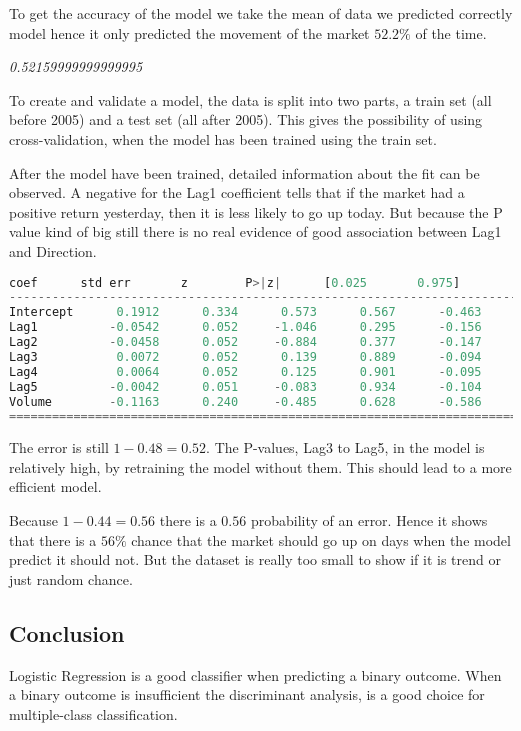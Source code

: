 To get the accuracy of the model we take the mean of data we predicted correctly model hence it only predicted the movement of the market $52.2\%$ of the time.

\noindent\textit{0.52159999999999995}

To create and validate a model, the data is split into two parts, a train set (all before 2005) and a test set (all after 2005). This gives the possibility of using cross-validation, when the model has been trained using the train set.

After the model have been trained, detailed information about the fit can be observed. A negative for the Lag1 coefficient tells that if the market had a positive return yesterday, then it is less likely to go up today. But because the P value kind of big still there is no real evidence of good association between Lag1 and Direction.

\begin{lstlisting}[language=Python]
                coef      std err       z        P>|z|      [0.025       0.975]
------------------------------------------------------------------------------
Intercept      0.1912      0.334      0.573      0.567      -0.463       0.845
Lag1          -0.0542      0.052     -1.046      0.295      -0.156       0.047
Lag2          -0.0458      0.052     -0.884      0.377      -0.147       0.056
Lag3           0.0072      0.052      0.139      0.889      -0.094       0.108
Lag4           0.0064      0.052      0.125      0.901      -0.095       0.108
Lag5          -0.0042      0.051     -0.083      0.934      -0.104       0.096
Volume        -0.1163      0.240     -0.485      0.628      -0.586       0.353
==============================================================================
\end{lstlisting}

The error is still $1 - 0.48 = 0.52$. The P-values, Lag3 to Lag5, in the model is relatively high, by retraining the model without them. This should lead to a more efficient model. 

Because $1 - 0.44 = 0.56$ there is a $0.56$ probability of an error. Hence it shows that there is a $56\%$ chance that the market should go up on days when the model predict it should not. But the dataset is really too small to show if it is trend or just random chance.

\subsection{Conclusion}
Logistic Regression is a good classifier when predicting a binary outcome. When a binary outcome is insufficient the discriminant analysis, is a good choice for multiple-class classification.
